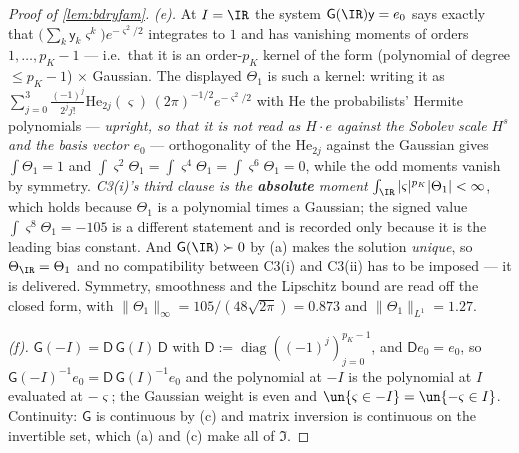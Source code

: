 \begin{proof}[Proof of \cref{lem:bdryfam}]
\emph{(e).} At $I=\IR$ the system $\mathsf G(\IR)\mathsf y=e_0$ says exactly that
$\big(\sum_k\mathsf y_k\varsigma^{k}\big)e^{-\varsigma^{2}/2}$ integrates to $1$ and has vanishing
moments of orders $1,\dots,p_K-1$ --- i.e.\ that it is an order-$p_K$ kernel of the form (polynomial of
degree $\le p_K-1$) $\times$ Gaussian. The displayed $\Theta_1$ is such a kernel: writing it as
$\sum_{j=0}^{3}\frac{(-1)^{j}}{2^{j}j!}\mathrm{He}_{2j}(\varsigma)\,(2\pi)^{-1/2}e^{-\varsigma^{2}/2}$ with
$\mathrm{He}$ the probabilists' Hermite polynomials --- \emph{upright, so that it is not read as
$H\cdot e$ against the Sobolev scale $H^{s}$ and the basis vector $e_0$} --- orthogonality of the
$\mathrm{He}_{2j}$ against the Gaussian gives
$\int\Theta_1=1$ and $\int\varsigma^{2}\Theta_1=\int\varsigma^{4}\Theta_1=\int\varsigma^{6}\Theta_1=0$,
while the odd moments vanish by symmetry. \emph{C3(i)'s third clause is the \textbf{absolute} moment}
$\int_\IR|\varsigma|^{p_K}|\Theta_1|<\infty$, which holds because $\Theta_1$ is a polynomial times a
Gaussian; the signed value $\int\varsigma^{8}\Theta_1=-105$ is a different statement and is recorded
only because it is the leading bias constant. And $\mathsf G(\IR)\succ0$ by (a) makes the solution \emph{unique}, so
$\Theta_\IR=\Theta_1$ and no compatibility between C3(i) and C3(ii) has to be imposed --- it is
delivered. Symmetry, smoothness and the Lipschitz bound are read off the closed form, with
$\|\Theta_1\|_\infty=105/(48\sqrt{2\pi})=0.873$ and $\|\Theta_1\|_{L^{1}}=1.27$.

\emph{(f).} $\mathsf G(-I)=\mathsf D\,\mathsf G(I)\,\mathsf D$ with $\mathsf D:=\operatorname{diag}((-1)^{j})_{j=0}^{p_K-1}$,
and $\mathsf De_0=e_0$, so $\mathsf G(-I)^{-1}e_0=\mathsf D\,\mathsf G(I)^{-1}e_0$ and the polynomial at
$-I$ is the polynomial at $I$ evaluated at $-\varsigma$; the Gaussian weight is even and
$\un\{\varsigma\in-I\}=\un\{-\varsigma\in I\}$. Continuity: $\mathsf G$ is continuous by (c) and matrix
inversion is continuous on the invertible set, which (a) and (c) make all of $\mathfrak I$.


\end{proof}
